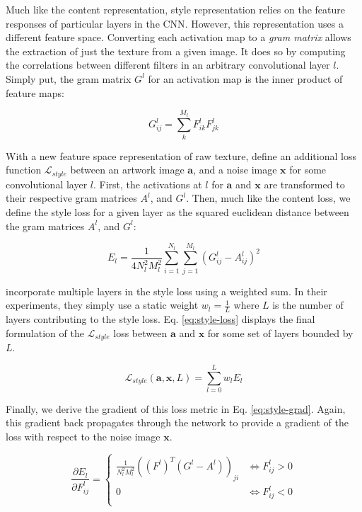\documentclass{article}
\begin{document}
Much like the content representation, style representation relies on the
feature responses of particular layers in the \ac{CNN}. However, this
representation uses a different feature space. Converting each activation
map to a \textit{gram matrix} allows the extraction of just the texture from
a given image. It does so by computing the correlations between different
filters in an arbitrary convolutional layer $l$. Simply put, the gram matrix
$G^l$ for an activation map is the inner product of feature maps:

\begin{equation}
G_{i j}^l = \sum_{k}^{M_l} F_{i k}^l F_{j k}^l
\end{equation}

With a new feature space representation of raw texture,
\cite{2015arXiv150806576G} define an additional loss function
$\mathcal{L}_{style}$ between an artwork image $\textbf{a}$, and a noise image
$\textbf{x}$ for some convolutional layer $l$. First, the activations at $l$
for $\textbf{a}$ and $\textbf{x}$ are transformed to their respective gram
matrices $A^l$, and $G^l$. Then, much like the content loss, we define
the style loss for a given layer as the squared euclidean distance between the
gram matrices $A^l$, and $G^l$:

\begin{equation}
E_l =
\frac{1}{4 N_l^2 M_l^2}
\sum_{i=1}^{N_l}\sum_{j=1}^{M_l}
(G^l_{ij} - A^l_{ij})^2
\end{equation}

\cite{2015arXiv150806576G} incorporate multiple layers in the style loss using
a weighted sum. In their experiments, they simply use a static weight
$w_l = \frac{1}{L}$ where $L$ is the number of layers contributing to the
style loss. Eq. \ref{eq:style-loss} displays the final formulation of the
$\mathcal{L}_{style}$ loss between $\textbf{a}$ and $\textbf{x}$ for some set
of layers bounded by $L$.

\begin{equation}
\label{eq:style-loss}
\mathcal{L}_{style}(\mathbf{a}, \mathbf{x}, L) = \sum_{l=0}^L w_l E_l
\end{equation}

Finally, we derive the gradient of this loss metric in Eq.
\ref{eq:style-grad}. Again, this gradient back propagates through the network
to provide a gradient of the loss with respect to the noise image
$\textbf{x}$.

\begin{equation}
\label{eq:style-grad}
\frac{\partial E_l}{\partial F^l_{ij}} =
\begin{cases}
    \frac{1}{N^2_l M^2_l}((F^l)^T (G^l - A^l))_{ji} & \iff F^l_{ij} > 0 \\
    0 & \iff F^l_{ij} < 0 \\
\end{cases}
\end{equation}
\end{document}
